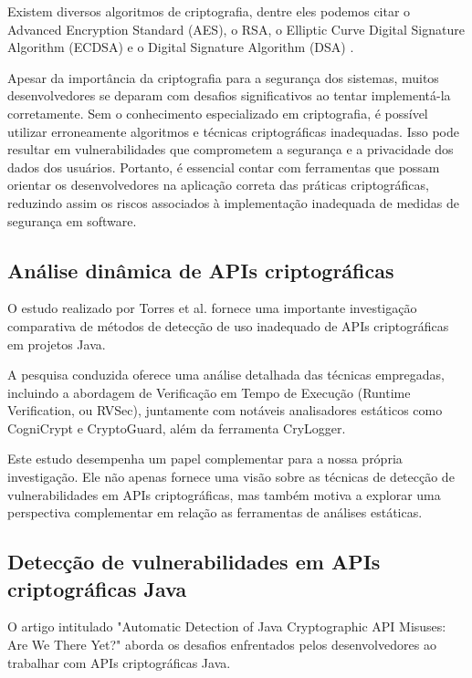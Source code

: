 Existem diversos algoritmos de criptografia, dentre eles podemos citar o Advanced Encryption Standard (AES), o RSA, o Elliptic Curve Digital Signature Algorithm (ECDSA) e o Digital Signature Algorithm (DSA) \cite{what_is_cryptography}.

Apesar da importância da criptografia para a segurança dos sistemas, muitos desenvolvedores se deparam com desafios significativos ao tentar implementá-la corretamente. Sem o conhecimento especializado em criptografia, é possível utilizar erroneamente algoritmos e técnicas criptográficas inadequadas. \cite{cryptographic_software_fail} \cite{api_misuses_zhang} Isso pode resultar em vulnerabilidades que comprometem a segurança e a privacidade dos dados dos usuários. Portanto, é essencial contar com ferramentas que possam orientar os desenvolvedores na aplicação correta das práticas criptográficas, reduzindo assim os riscos associados à implementação inadequada de medidas de segurança em software.\cite{api_misuses_zhang}

\subsection{Análise dinâmica de APIs criptográficas} %

O estudo realizado por Torres et al. \cite{runtime_verification_crypto} fornece uma importante investigação comparativa de métodos de detecção de uso inadequado de APIs criptográficas em projetos Java.

A pesquisa conduzida oferece uma análise detalhada das técnicas empregadas, incluindo a abordagem de Verificação em Tempo de Execução (Runtime Verification, ou RVSec), juntamente com notáveis analisadores estáticos como CogniCrypt e CryptoGuard, além da ferramenta CryLogger.

Este estudo desempenha um papel complementar para a nossa própria investigação. Ele não apenas fornece uma visão sobre as técnicas de detecção de vulnerabilidades em APIs criptográficas, mas também motiva a explorar uma perspectiva complementar em relação as ferramentas de análises estáticas. 

\subsection{Detecção de vulnerabilidades em APIs criptográficas Java} %

O artigo intitulado "Automatic Detection of Java Cryptographic API Misuses: Are We There Yet?" \cite{api_misuses_zhang} aborda os desafios enfrentados pelos desenvolvedores ao trabalhar com APIs criptográficas Java. 

